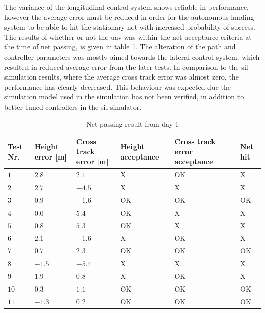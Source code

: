 The variance of the longitudinal control system shows reliable in performance, however the average error must be reduced in order for the autonomous landing system to be able to hit the stationary net with increased probability of success. The results of whether or not the \gls{uav} was within the net acceptance criteria at the time of net passing, is given in table \ref{tb:Day1LandingAttempt}. The alteration of the path and controller parameters was mostly aimed towards the lateral control system, which resulted in reduced average error from the later tests. In comparison to the \gls{sil} simulation results, where the average cross track error was almost zero, the performance has clearly decreased. This behaviour was expected due the simulation model used in the simulation has not been verified, in addition to better tuned controllers in the \gls{sil} simulator.
\begin{table}[H]
\centering
\begin{tabular}{| p{0.5cm} | p{1cm} | p{1cm} | p{3.5cm} | p{3cm} | p{1cm} |}
\hline
\textbf{Test Nr.}	& \textbf{Height error [m]}	& \textbf{Cross track error [m]}& \textbf{Height acceptance}& \textbf{Cross track error acceptance}	& \textbf{Net hit}\\ \hline
$1$				& $2.8$		& $2.1$		& X								& OK									& X					\\ \hline
$2$				& $2.7$		& $-4.5$	& X								& X										& X					\\ \hline
$3$				& $0.9$		& $-1.6$	& OK							& OK									& OK				\\ \hline
$4$				& $0.0$		& $5.4$		& OK							& X										& X					\\ \hline
$5$				& $0.8$		& $5.3$		& OK							& X										& X					\\ \hline
$6$				& $2.1$		& $-1.6$	& X								& OK									& X					\\ \hline
$7$				& $0.7$		& $2.3$		& OK							& OK									& OK				\\ \hline
$8$				& $-1.5$	& $-5.4$	& X								& X										& X					\\ \hline
$9$				& $1.9$		& $0.8$		& X								& OK									& X					\\ \hline
$10$			& $0.3$	& $1.1$		& OK							& OK									& OK				\\ \hline
$11$			& $-1.3$	& $0.2$		& OK							& OK									& OK				\\ \hline
\end{tabular}
\caption{Net passing result from day 1}
\label{tb:Day1LandingAttempt}
\end{table}

